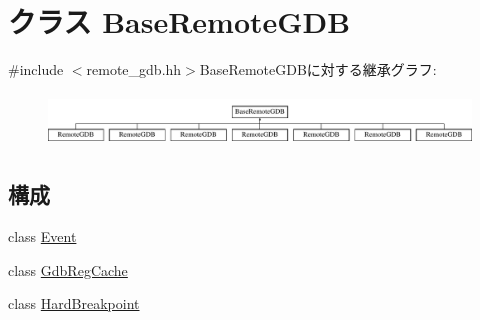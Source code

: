 \hypertarget{classBaseRemoteGDB}{
\section{クラス BaseRemoteGDB}
\label{classBaseRemoteGDB}
}


{\ttfamily \#include $<$remote\_\-gdb.hh$>$}BaseRemoteGDBに対する継承グラフ:\begin{figure}[H]
\begin{center}
\leavevmode
\includegraphics[height=1.3913cm]{classBaseRemoteGDB}
\end{center}
\end{figure}
\subsection*{構成}
\begin{DoxyCompactItemize}
\item 
class \hyperlink{classBaseRemoteGDB_1_1Event}{Event}
\item 
class \hyperlink{classBaseRemoteGDB_1_1GdbRegCache}{GdbRegCache}
\item 
class \hyperlink{classBaseRemoteGDB_1_1HardBreakpoint}{HardBreakpoint}
\end{DoxyCompactItemize}
